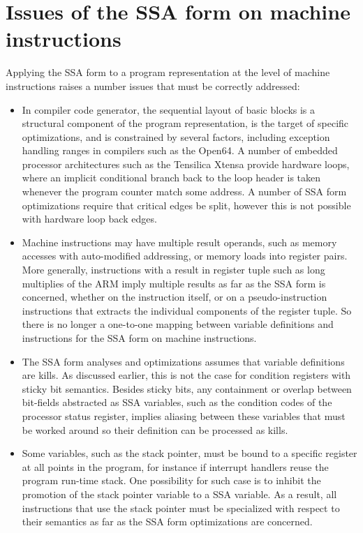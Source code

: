 \section{Issues of the SSA form on machine instructions}

Applying the SSA form to a program representation at the level of machine
instructions raises a number issues that must be correctly addressed:
\begin{itemize}

\item In compiler code generator, the sequential layout of basic blocks is a
structural component of the program representation, is the target of specific
optimizations, and is constrained by several factors, including exception
handling ranges in compilers such as the Open64. A number of embedded processor
architectures such as the Tensilica Xtensa provide hardware loops, where an
implicit conditional branch back to the loop header is taken whenever the
program counter match some address. A number of SSA form optimizations require
that critical edges be split, however this is not possible with hardware loop
back edges.

\item Machine instructions may have multiple result operands, such as memory
accesses with auto-modified addressing, or memory loads into register pairs.
More generally, instructions with a result in register tuple such as long
multiplies of the ARM imply multiple results as far as the SSA form is
concerned, whether on the instruction itself, or on a pseudo-instruction
instructions that extracts the individual components of the register tuple. So
there is no longer a one-to-one mapping between variable definitions and
instructions for the SSA form on machine instructions.

\item The SSA form analyses and optimizations assumes that variable definitions
are kills. As discussed earlier, this is not the case for condition registers
with sticky bit semantics. Besides sticky bits, any containment or overlap
between bit-fields abstracted as SSA variables, such as the condition codes of
the processor status register, implies aliasing between these variables that
must be worked around so their definition can be processed as kills.

\item Some variables, such as the stack pointer, must be bound to a specific
register at all points in the program, for instance if interrupt handlers reuse
the program run-time stack. One possibility for such case is to inhibit the
promotion of the stack pointer variable to a SSA variable. As a result, all
instructions that use the stack pointer must be specialized with respect to
their semantics as far as the SSA form optimizations are concerned.


\end{itemize}

